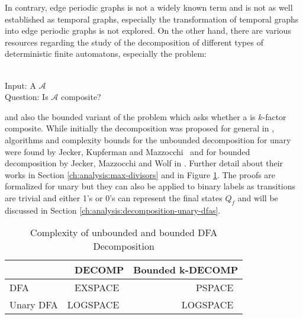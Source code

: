 In contrary, edge periodic graphs is not a widely known term and is not as well established as temporal graphs, especially the transformation of temporal graphs into edge periodic graphs is not explored. On the other hand, there are various resources regarding the study of the decomposition of different types of deterministic finite automatons, especially the problem:
\begin{defn}{\ \\}
	Input: A \DFA $\mathcal{A}$\\
	Question: Is $\mathcal{A}$ composite?
\end{defn}
and also the bounded variant of the problem which asks whether a \DFA is $k$-factor composite. While initially the decomposition was proposed for general \DFAs in \cite{prime-languages}, algorithms and complexity bounds for the unbounded decomposition for unary \DFAs were found by Jecker, Kupferman and Mazzocchi~\cite{unara-prime-languages} and for bounded decomposition by  Jecker, Mazzocchi and Wolf in \cite{DBLP:journals/corr/abs-2107-04683}. Further detail about their works in Section \ref{ch:analysis:max-divisors} and in Figure \ref{tab:dfa-decomp-complexity}. The proofs are formalized for unary \DFAs but they can also be applied to binary labels as transitions are trivial and either 1's or 0's can represent the final states $Q_f$ and will be discussed in Section \ref{ch:analysis:decomposition-unary-dfas}.
\begin{table}[h]
	\centering
	\begin{tabular}{l|rr}
		&  DECOMP & Bounded k-DECOMP  \\
		\hline
		DFA & EXSPACE~\cite{prime-languages} & PSPACE~\cite{DBLP:journals/corr/abs-2107-04683}  \\
		Unary DFA & LOGSPACE~\cite{unara-prime-languages} &  LOGSPACE~\cite{DBLP:journals/corr/abs-2107-04683}
	\end{tabular}
	\caption{Complexity of unbounded and bounded DFA Decomposition}
	\label{tab:dfa-decomp-complexity}
\end{table}


